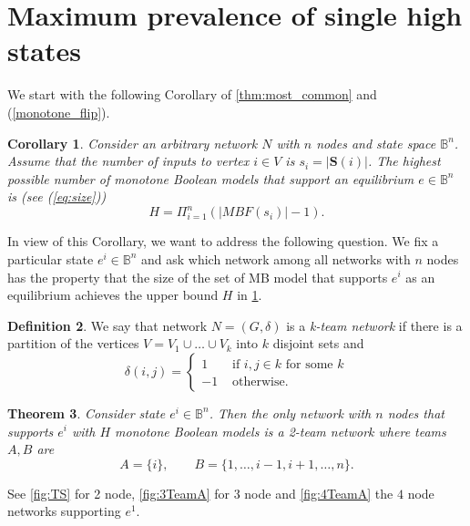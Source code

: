\documentclass[12pt]{amsart}
\newcommand{\bbB}{\mathbb{B}}
\newcommand{\Sources}{\mathbf{S}}
\newtheorem{thm}{Theorem}[section]
\newtheorem{cor}[thm]{Corollary}
\theoremstyle{definition}
\newtheorem{defn}[thm]{Definition}
\begin{document}

\section{Maximum prevalence of single high states} \label{sec:singlehigh}

We start with the following Corollary of \cref{thm:most_common} and (\ref{monotone_flip}). 
\begin{cor} \label{lem:bound}
Consider an arbitrary network $N$ with $n$ nodes and state space $\bbB^n$. Assume that the number of inputs to vertex $i \in V$ is $s_i=|\Sources(i)|$.
    The highest possible number of monotone Boolean models that support an equilibrium $e \in \bbB^n$ is (see (\ref{eq:size}))
    \[ H=\Pi_{i=1}^n (|MBF(s_i)|-1). \]
    \end{cor}

In view of this Corollary, we want to address the following question. We fix a particular state $e^i \in \bbB^n$ and ask which network among all networks with $n$ nodes has the property that the size of the set of MB model that supports $e^i$ as an equilibrium achieves the upper bound $H$ in \cref{lem:bound}.

\begin{defn}
We say that network $N=(G,\delta)$ is a \textit{k-team network} if there is a partition of the vertices $V=V_1 \cup \ldots \cup V_k$ into $k$ disjoint sets and 
\[ \delta(i,j)=\left \{ 
\begin{array}{cc}
1 & \mbox{ if } i, j \in k \mbox{ for some } k\\
-1 & \mbox{ otherwise.} 
\end{array}
\right.
\]
\end{defn}


\begin{thm}\label{two_team}
    Consider state $e^i \in \bbB^n$. Then the only network with $n$ nodes that supports $e^i$ with $H$ monotone Boolean models is a 2-team network where teams $A,B$ are 
    \[ A=\{i\}, \qquad B=\{1,\ldots,{i-1},i+1,\ldots, n\}.\]
    \end{thm}
    See \cref{fig:TS} for 2 node, \cref{fig:3TeamA} for $3$ node and \cref{fig:4TeamA} the $4$ node networks supporting $e^1$.
\end{document}
